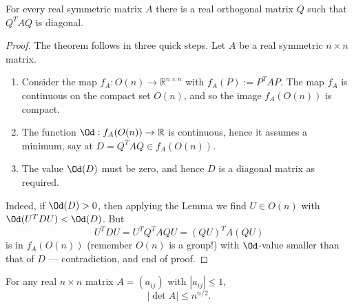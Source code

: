 \begin{theorem}
  \label{diagonalize_real_symmetric}
  \leanok
  For every real symmetric matrix $A$ there is a real
  orthogonal matrix $Q$ such that $Q^{T}AQ$ is diagonal.
\end{theorem}
\begin{proof}
  The theorem follows in three quick steps. Let $A$ be a real symmetric $n \times n$ matrix.
  \begin{enumerate}
    \item[(A)] Consider the map $f_A : O(n) \to \mathbb{R}^{n \times n}$ with $f_A(P) := P^T A P$. The map $f_A$ is continuous on the compact set $O(n)$, and so the image $f_A(O(n))$ is compact.
    \item[(B)] The function $\Od : f_A(O(n)) \to \mathbb{R}$ is continuous, hence it assumes a minimum, say at $D = Q^T A Q \in f_A(O(n))$.
    \item[(C)] The value $\Od(D)$ must be zero, and hence $D$ is a diagonal matrix as required.
  \end{enumerate}
  Indeed, if $\Od(D) > 0$, then applying the Lemma we find $U \in O(n)$ with $\Od(U^T D U) < \Od(D)$. But
  \[
  U^T D U = U^T Q^T A Q U = (QU)^T A (QU)
  \]
  is in $f_A(O(n))$ (remember $O(n)$ is a group!) with $\Od$-value smaller than that of $D$ --- contradiction, and end of proof.
\end{proof}

\begin{theorem}
  \label{thm:hadamard_inequality}
  For any real $n \times n$ matrix $A = (a_{ij})$ with $|a_{ij}| \le 1$,
  \[
  |\det A| \le n^{n/2}.
  \]
\end{theorem}

